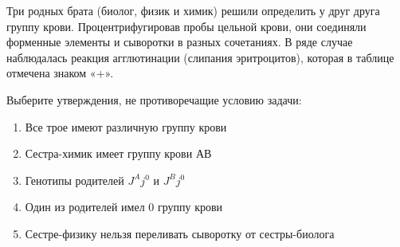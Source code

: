 
Три родных
брата (биолог, физик и химик) решили определить у друг друга группу крови.
Процентрифугировав пробы цельной крови, они соединяли форменные элементы и
сыворотки в разных сочетаниях. В ряде случае наблюдалась реакция агглютинации (слипания
эритроцитов), которая в таблице отмечена знаком «+».


Выберите утверждения, не противоречащие
условию задачи:

\begin{enumerate}
    \item Все трое имеют различную группу крови 
    \item Сестра-химик имеет группу крови АВ
    \item Генотипы родителей $J^Aj^0$ и $J^Bj^0$
    \item Один из родителей имел 0 группу крови
    \item Сестре-физику нельзя переливать сыворотку от сестры-биолога
\end{enumerate}



